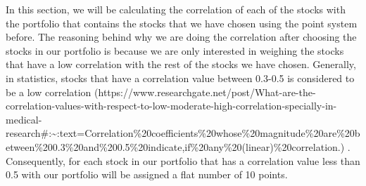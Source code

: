 \documentclass[11pt]{article}
\begin{document}
In this section, we will be calculating the correlation of each of the
stocks with the portfolio that contains the stocks that we have chosen
using the point system before. The reasoning behind why we are doing the
correlation after choosing the stocks in our portfolio is because we are
only interested in weighing the stocks that have a low correlation with
the rest of the stocks we have chosen. Generally, in statistics, stocks
that have a correlation value between 0.3-0.5 is considered to be a low
correlation
(https://www.researchgate.net/post/What-are-the-correlation-values-with-respect-to-low-moderate-high-correlation-specially-in-medical-research\#:\textasciitilde:text=Correlation\%20coefficients\%20whose\%20magnitude\%20are\%20between\%200.3\%20and\%200.5\%20indicate,if\%20any\%20(linear)\%20correlation.)
. Consequently, for each stock in our portfolio that has a correlation
value less than 0.5 with our portfolio will be assigned a flat number of
10 points.
\end{document}
